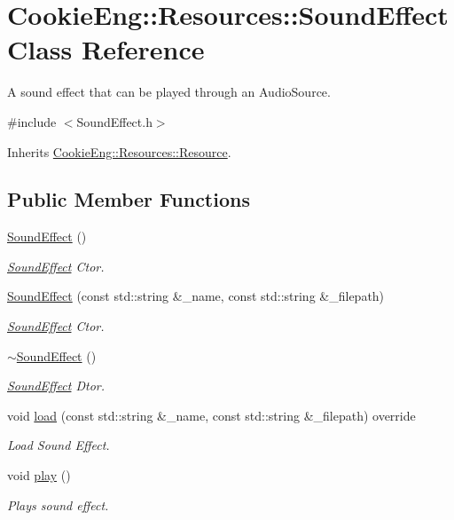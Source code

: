 \hypertarget{class_cookie_eng_1_1_resources_1_1_sound_effect}{}\section{Cookie\+Eng\+:\+:Resources\+:\+:Sound\+Effect Class Reference}
\label{class_cookie_eng_1_1_resources_1_1_sound_effect}


A sound effect that can be played through an Audio\+Source.  




{\ttfamily \#include $<$Sound\+Effect.\+h$>$}



Inherits \hyperlink{class_cookie_eng_1_1_resources_1_1_resource}{Cookie\+Eng\+::\+Resources\+::\+Resource}.

\subsection*{Public Member Functions}
\begin{DoxyCompactItemize}
\item 
\hyperlink{class_cookie_eng_1_1_resources_1_1_sound_effect_a7764233aa4404ea4991961ecf48bfde4}{Sound\+Effect} ()
\begin{DoxyCompactList}\small\item\em \hyperlink{class_cookie_eng_1_1_resources_1_1_sound_effect}{Sound\+Effect} Ctor. \end{DoxyCompactList}\item 
\hyperlink{class_cookie_eng_1_1_resources_1_1_sound_effect_a57ef9e03fcedaa554b17132ead52153d}{Sound\+Effect} (const std\+::string \&\+\_\+name, const std\+::string \&\+\_\+filepath)
\begin{DoxyCompactList}\small\item\em \hyperlink{class_cookie_eng_1_1_resources_1_1_sound_effect}{Sound\+Effect} Ctor. \end{DoxyCompactList}\item 
\hyperlink{class_cookie_eng_1_1_resources_1_1_sound_effect_a5bae1940555d6e731693a74bc1737f4a}{$\sim$\+Sound\+Effect} ()
\begin{DoxyCompactList}\small\item\em \hyperlink{class_cookie_eng_1_1_resources_1_1_sound_effect}{Sound\+Effect} Dtor. \end{DoxyCompactList}\item 
void \hyperlink{class_cookie_eng_1_1_resources_1_1_sound_effect_a702862c8bf0f69c19ef5e680f0e18ca0}{load} (const std\+::string \&\+\_\+name, const std\+::string \&\+\_\+filepath) override
\begin{DoxyCompactList}\small\item\em Load Sound Effect. \end{DoxyCompactList}\item 
void \hyperlink{class_cookie_eng_1_1_resources_1_1_sound_effect_a9f4e738f2cbc849e7fab8549bf09fb02}{play} ()
\begin{DoxyCompactList}\small\item\em Plays sound effect. \end{DoxyCompactList}\end{DoxyCompactItemize}

